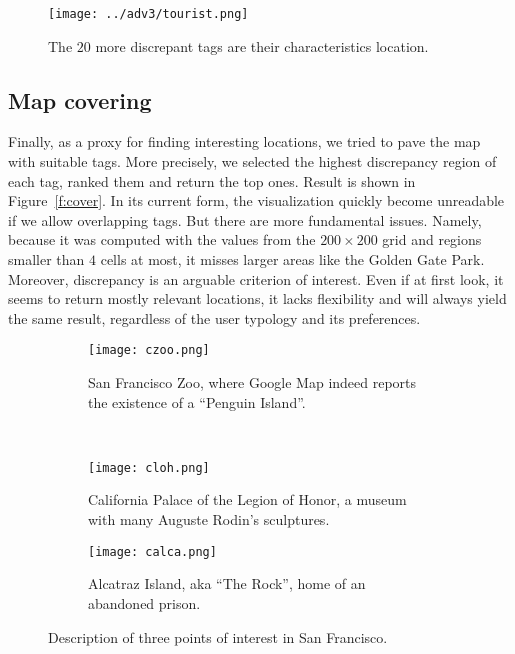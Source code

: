 \begin{figure}[b]
\centering
\vspace{-2.8\baselineskip}
\texttt{[image: ../adv3/tourist.png]}
\caption{The $20$ more discrepant tags are their characteristics
location.\label{f:cover}}
\end{figure}

\subsection{Map covering}

Finally, as a proxy for finding interesting locations, we tried to pave the
map with suitable tags. More precisely, we selected the highest discrepancy
region of each tag, ranked them and return the top ones. Result is shown in
Figure~\vref{f:cover}. In its current form, the visualization quickly become
unreadable if we allow overlapping tags. But there are more fundamental
issues. Namely, because it was computed with the values from the $200\times
200$ grid and regions smaller than $4$ cells at most, it misses larger areas
like the Golden Gate Park.  Moreover, discrepancy is an arguable criterion of
interest. Even if at first look, it seems to return mostly relevant locations,
it lacks flexibility and will always yield the same result, regardless of the
user typology and its preferences.

\begin{figure}
        \centering
        \begin{subfigure}[b]{0.5\textwidth}
                \texttt{[image: czoo.png]}
                \caption{San Francisco Zoo, where Google Map indeed reports
the existence of a \enquote{Penguin Island}.}
        \end{subfigure}~
        \begin{subfigure}[b]{0.5\textwidth}
                \texttt{[image: cloh.png]}
                \caption{California Palace of the Legion of Honor, a museum
					with many Auguste Rodin's sculptures.}
        \end{subfigure}

        \begin{subfigure}[b]{0.5\textwidth}
                \texttt{[image: calca.png]}
                \caption{Alcatraz Island, aka \enquote{The Rock}, home of an
abandoned prison.\label{f:alca}}
        \end{subfigure}
		\caption{Description of three points of interest in San Francisco.\label{f:loc}}
\end{figure}
